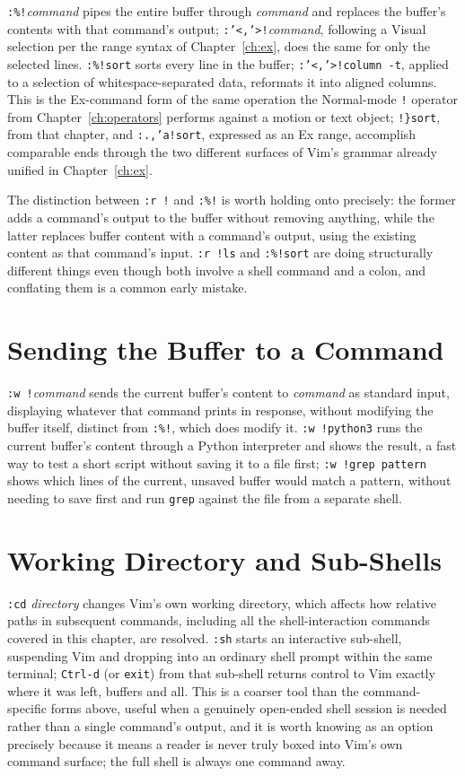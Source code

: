 \texttt{:\%!}\textit{command} pipes the entire buffer through \textit{command} and replaces the buffer's contents with that command's output; \texttt{:'<,'>!}\textit{command}, following a Visual selection per the range syntax of Chapter~\ref{ch:ex}, does the same for only the selected lines. \texttt{:\%!sort} sorts every line in the buffer; \texttt{:'<,'>!column -t}, applied to a selection of whitespace-separated data, reformats it into aligned columns. This is the Ex-command form of the same operation the Normal-mode \texttt{!} operator from Chapter~\ref{ch:operators} performs against a motion or text object; \texttt{!\}sort}, from that chapter, and \texttt{:.,'a!sort}, expressed as an Ex range, accomplish comparable ends through the two different surfaces of Vim's grammar already unified in Chapter~\ref{ch:ex}.

The distinction between \texttt{:r !} and \texttt{:\%!} is worth holding onto precisely: the former adds a command's output to the buffer without removing anything, while the latter replaces buffer content with a command's output, using the existing content as that command's input. \texttt{:r !ls} and \texttt{:\%!sort} are doing structurally different things even though both involve a shell command and a colon, and conflating them is a common early mistake.

\section{Sending the Buffer to a Command}

\texttt{:w !}\textit{command} sends the current buffer's content to \textit{command} as standard input, displaying whatever that command prints in response, without modifying the buffer itself, distinct from \texttt{:\%!}, which does modify it. \texttt{:w !python3} runs the current buffer's content through a Python interpreter and shows the result, a fast way to test a short script without saving it to a file first; \texttt{:w !grep pattern} shows which lines of the current, unsaved buffer would match a pattern, without needing to save first and run \texttt{grep} against the file from a separate shell.

\section{Working Directory and Sub-Shells}

\texttt{:cd} \textit{directory} changes Vim's own working directory, which affects how relative paths in subsequent commands, including all the shell-interaction commands covered in this chapter, are resolved. \texttt{:sh} starts an interactive sub-shell, suspending Vim and dropping into an ordinary shell prompt within the same terminal; \texttt{Ctrl-d} (or \texttt{exit}) from that sub-shell returns control to Vim exactly where it was left, buffers and all. This is a coarser tool than the command-specific forms above, useful when a genuinely open-ended shell session is needed rather than a single command's output, and it is worth knowing as an option precisely because it means a reader is never truly boxed into Vim's own command surface; the full shell is always one command away.

